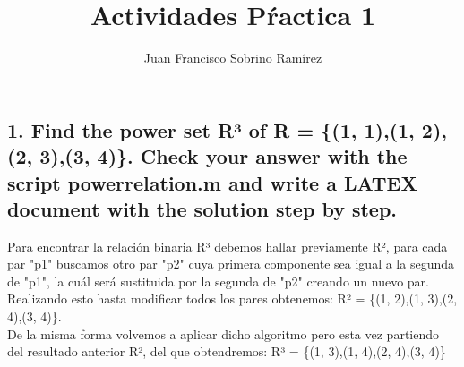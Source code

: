 \documentclass[20pt,oneside]{extbook}
\title{\Huge {Actividades Pŕactica 1}}
\author{Juan Francisco Sobrino Ramírez}
\date{}
\begin{document}
\maketitle

\newpage 
\subsection*{1. Find the power set R³ of R = \{(1, 1),(1, 2),(2, 3),(3, 4)\}. Check your answer with the script powerrelation.m and write a LATEX document with the solution step by step.}

Para encontrar la relación binaria R³ debemos hallar previamente R², para cada par "p1" buscamos otro par "p2" cuya primera componente sea igual a la segunda de "p1", la cuál será sustituida por la segunda de "p2" creando un nuevo par.\\

Realizando esto hasta modificar todos los pares obtenemos:  R² = \{(1, 2),(1, 3),(2, 4),(3, 4)\}.\\

De la misma forma volvemos a aplicar dicho algoritmo pero esta vez partiendo del resultado anterior R², del que obtendremos: R³ = \{(1, 3),(1, 4),(2, 4),(3, 4)\}
\end{document}
